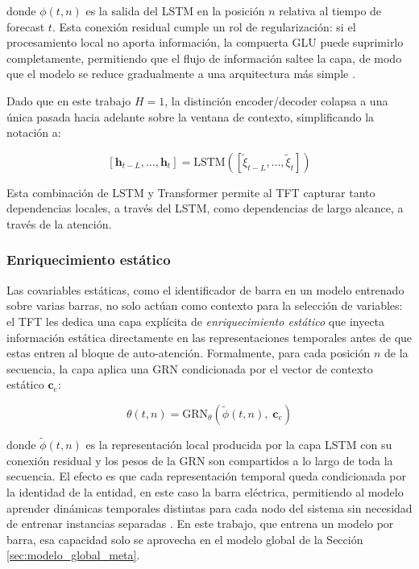 donde $\phi(t, n)$ es la salida del LSTM en la posición $n$ relativa al tiempo de forecast $t$. Esta conexión residual cumple un rol de regularización: si el procesamiento local no aporta información, la compuerta GLU puede suprimirlo completamente, permitiendo que el flujo de información saltee la capa, de modo que el modelo se reduce gradualmente a una arquitectura más simple \cite{TFT}.
 
Dado que en este trabajo $H = 1$, la distinción encoder/decoder colapsa a una única pasada hacia adelante sobre la ventana de contexto, simplificando la notación a:

\begin{equation}
\left[\mathbf{h}_{t-L}, \ldots, \mathbf{h}_t\right] = \text{LSTM}\left(\left[\tilde{\xi}_{t-L}, \ldots, \tilde{\xi}_t\right]\right)
\end{equation}

Esta combinación de LSTM y Transformer permite al TFT capturar tanto dependencias locales, a través del LSTM, como dependencias de largo alcance, a través de la atención.

\subsubsection{Enriquecimiento estático}

Las covariables estáticas, como el identificador de barra en un modelo entrenado sobre varias barras, no solo actúan como contexto para la selección de variables: el TFT les dedica una capa explícita de \textit{enriquecimiento estático} que inyecta información estática directamente en las representaciones temporales antes de que estas entren al bloque de auto-atención. Formalmente, para cada posición $n$ de la secuencia, la capa aplica una GRN condicionada por el vector de contexto estático $\mathbf{c}_e$:
 
\begin{equation}
\theta(t, n) = \text{GRN}_\theta\!\left(\tilde{\phi}(t, n),\; \mathbf{c}_e\right)
\end{equation}
 
donde $\tilde{\phi}(t, n)$ es la representación local producida por la capa LSTM con su conexión residual y los pesos de la GRN son compartidos a lo largo de toda la secuencia. El efecto es que cada representación temporal queda condicionada por la identidad de la entidad, en este caso la barra eléctrica, permitiendo al modelo aprender dinámicas temporales distintas para cada nodo del sistema sin necesidad de entrenar instancias separadas \cite{TFT}. En este trabajo, que entrena un modelo por barra, esa capacidad solo se aprovecha en el modelo global de la Sección \ref{sec:modelo_global_meta}.

